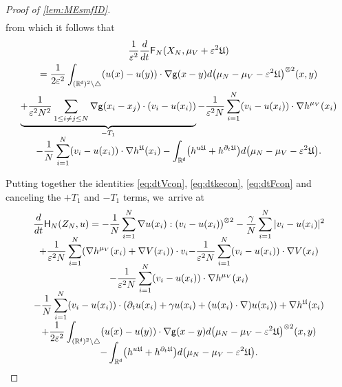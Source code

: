 \documentclass[JEP,XML,SOM,Unicode,published]{cedram}
\theoremstyle{plain}
\theoremstyle{definition}
\DeclarePairedDelimiter{\pa}{\lparen}{\rparen}
\let\div\relax
\DeclareMathOperator{\div}{\mathrm{div}}
\newcommand{\R}{{\mathbb{R}}}
\let\ga\gamma
\let\vep\varepsilon
\let\nab\nabla
\let\p\partial
\let\ux X
\let\uz Z
\newcommand{\Uu}{\mathfrak{U}}
\newcommand{\Fr}{\mathsf{F}}
\newcommand{\Hr}{\mathsf{H}}
\renewcommand{\d}{\mathsf{d}}
\newcommand{\g}{{\mathsf{g}}}
\begin{document}
\begin{proof}[Proof of \cref{lem:MEsmfID}]
\begin{multline*}
\end{multline*}
from which it follows that\vspace*{-5pt}
\begin{multline}\label{eq:dtFcon}
\frac{1}{\vep^2}\frac{d}{dt} \Fr_N(\ux_N, \mu_V + \vep^2\Uu)\\
= \frac{1}{2\vep^2}\int_{(\R^\d)^2\setminus\triangle} \pa*{u(x)-u(y)}\cdot\nabla\g(x-y)d\pa*{\mu_N-\mu_V-\vep^2\Uu}^{\otimes 2}(x,y) \\
\underbrace{+\frac{1}{\vep^2 N^2}\sum_{1\leq i\neq j\leq N} \nabla\g(x_i-x_j)\cdot \pa*{v_i - u(x_i)}}_{-T_1} -\frac{1}{\vep^2 N}\sum_{i=1}^N (v_i-u(x_i))\cdot\nabla h^{\mu_V}(x_i) \\[-5pt]
- \frac{1}{N}\sum_{i=1}^N (v_i-u(x_i)) \cdot \nabla h^{\Uu}(x_i) -\int_{\R^\d}\pa*{\div h^{u\Uu}+h^{\p_t\Uu}}d\pa*{\mu_N-\mu_V-\vep^2\Uu}.
\end{multline}

Putting together the identities \eqref{eq:dtVcon}, \eqref{eq:dtkecon}, \eqref{eq:dtFcon} and canceling the $+T_1$ and $-T_{1}$ terms, we~arrive at\vspace*{-8pt}
\begin{multline}\label{eq:dtHcon}
\frac{d}{dt}\Hr_{N}(\uz_N,u) = -\frac{1}{N}\sum_{i=1}^N \nab u(x_i) : \pa*{v_i - u(x_i)}^{\otimes2}-\frac{\ga}{N}\sum_{i=1}^N |v_i-u(x_i)|^2\\[-7pt]
{+\frac{1}{\vep^2 N}\sum_{i=1}^N\pa*{\nabla h^{\mu_V}(x_i) + \nabla V(x_i)}\cdot v_i {-\frac{1}{\vep^2 N}\sum_{i=1}^N \pa*{v_i - u(x_i)}\cdot\nabla V(x_i)}} \\[-7pt]
{-\frac{1}{\vep^2 N}\sum_{i=1}^N (v_i-u(x_i))\cdot\nabla h^{\mu_V}(x_i)}\\[-7pt]
{- \frac{1}{N}\sum_{i=1}^N \pa*{v_i - u(x_i)}\cdot\pa*{\p_t u(x_i) + \ga u(x_i) + (u(x_i)\cdot\nabla) u(x_i)} + \nabla h^{\Uu}(x_i)} \\[-3pt]
+\frac{1}{2\vep^2}\int_{(\R^\d)^2\setminus\triangle} \pa*{u(x)-u(y)}\cdot\nabla\g(x-y)d\pa*{\mu_N-\mu_V-\vep^2\Uu}^{\otimes 2}(x,y) \\[-7pt]
-\int_{\R^\d}\pa*{\div h^{u\Uu}+h^{\p_t\Uu}}d\pa*{\mu_N-\mu_V-\vep^2\Uu}.
\end{multline}


\end{proof}
\end{document}
